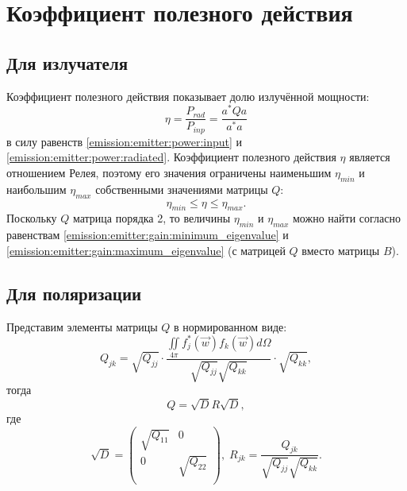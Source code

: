 \section{Коэффициент полезного действия}

\subsection{Для излучателя}

Коэффициент полезного действия показывает долю излучённой мощности:
\[
    \eta
    = \frac{P_{rad}}{P_{inp}}
    = \frac{a^* Q a}{a^* a}
\]
в силу равенств \eqref{emission:emitter:power:input} и \eqref{emission:emitter:power:radiated}. Коэффициент полезного действия $\eta$ является отношением Релея,
поэтому его значения ограничены наименьшим $\eta_{min}$ и наибольшим $\eta_{max}$ собственными значениями матрицы $Q$:
\[
    \eta_{min} \le \eta \le \eta_{max} .
\]
Поскольку $Q$ матрица порядка 2, то величины $\eta_{min}$ и $\eta_{max}$ можно найти согласно равенствам \eqref{emission:emitter:gain:minimum_eigenvalue} и
\eqref{emission:emitter:gain:maximum_eigenvalue} (с матрицей $Q$ вместо матрицы $B$).

\subsection{Для поляризации}

Представим элементы матрицы $Q$ в нормированном виде:
\[
    Q_{jk}
    =
    \sqrt{Q_{jj}}
    \cdot
    \frac{\iint \limits_{4 \pi} f_j^*(\vec{w}) f_k(\vec{w}) d \Omega}{\sqrt{Q_{jj}} \sqrt{Q_{kk}}}
    \cdot
    \sqrt{Q_{kk}} ,
\]
тогда
\[
    Q = \sqrt{D} R \sqrt{D} ,
\]
где
\[
    \sqrt{D}
    = \begin{pmatrix}
          \sqrt{Q_{11}} & 0          \\
          0          & \sqrt{Q_{22}} \\
    \end{pmatrix} ,
    \;
    R_{jk} = \frac{Q_{jk}}{\sqrt{Q_{jj}} \sqrt{Q_{kk}}} .
\]

